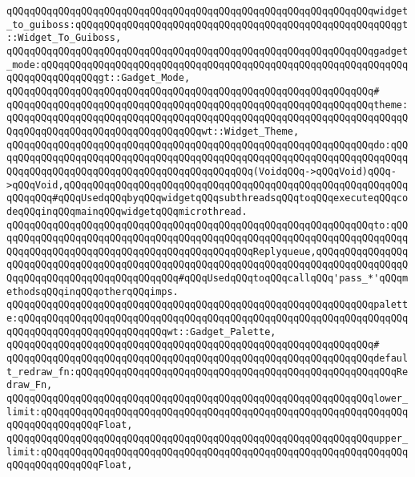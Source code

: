 \verb|qQQqqQQqqQQqqQQqqQQqqQQqqQQqqQQqqQQqqQQqqQQqqQQqqQQqqQQqqQQqqQQqwidget_to_guiboss:qQQqqQQqqQQqqQQqqQQqqQQqqQQqqQQqqQQqqQQqqQQqqQQqqQQqqQQqgt::Widget_To_Guiboss,|\newline
\verb|qQQqqQQqqQQqqQQqqQQqqQQqqQQqqQQqqQQqqQQqqQQqqQQqqQQqqQQqqQQqqQQqgadget_mode:qQQqqQQqqQQqqQQqqQQqqQQqqQQqqQQqqQQqqQQqqQQqqQQqqQQqqQQqqQQqqQQqqQQqqQQqqQQqqQQqgt::Gadget_Mode,|\newline
\verb|qQQqqQQqqQQqqQQqqQQqqQQqqQQqqQQqqQQqqQQqqQQqqQQqqQQqqQQqqQQqqQQq#|\newline
\verb|qQQqqQQqqQQqqQQqqQQqqQQqqQQqqQQqqQQqqQQqqQQqqQQqqQQqqQQqqQQqqQQqtheme:qQQqqQQqqQQqqQQqqQQqqQQqqQQqqQQqqQQqqQQqqQQqqQQqqQQqqQQqqQQqqQQqqQQqqQQqqQQqqQQqqQQqqQQqqQQqqQQqqQQqqQQqwt::Widget_Theme,|\newline
\verb|qQQqqQQqqQQqqQQqqQQqqQQqqQQqqQQqqQQqqQQqqQQqqQQqqQQqqQQqqQQqqQQqdo:qQQqqQQqqQQqqQQqqQQqqQQqqQQqqQQqqQQqqQQqqQQqqQQqqQQqqQQqqQQqqQQqqQQqqQQqqQQqqQQqqQQqqQQqqQQqqQQqqQQqqQQqqQQqqQQqqQQq(VoidqQQq->qQQqVoid)qQQq->qQQqVoid,qQQqqQQqqQQqqQQqqQQqqQQqqQQqqQQqqQQqqQQqqQQqqQQqqQQqqQQqqQQqqQQqqQQq#qQQqUsedqQQqbyqQQqwidgetqQQqsubthreadsqQQqtoqQQqexecuteqQQqcodeqQQqinqQQqmainqQQqwidgetqQQqmicrothread.|\newline
\verb|qQQqqQQqqQQqqQQqqQQqqQQqqQQqqQQqqQQqqQQqqQQqqQQqqQQqqQQqqQQqqQQqto:qQQqqQQqqQQqqQQqqQQqqQQqqQQqqQQqqQQqqQQqqQQqqQQqqQQqqQQqqQQqqQQqqQQqqQQqqQQqqQQqqQQqqQQqqQQqqQQqqQQqqQQqqQQqqQQqqQQqReplyqueue,qQQqqQQqqQQqqQQqqQQqqQQqqQQqqQQqqQQqqQQqqQQqqQQqqQQqqQQqqQQqqQQqqQQqqQQqqQQqqQQqqQQqqQQqqQQqqQQqqQQqqQQqqQQqqQQqqQQq#qQQqUsedqQQqtoqQQqcallqQQq'pass_*'qQQqmethodsqQQqinqQQqotherqQQqimps.|\newline
\verb|qQQqqQQqqQQqqQQqqQQqqQQqqQQqqQQqqQQqqQQqqQQqqQQqqQQqqQQqqQQqqQQqpalette:qQQqqQQqqQQqqQQqqQQqqQQqqQQqqQQqqQQqqQQqqQQqqQQqqQQqqQQqqQQqqQQqqQQqqQQqqQQqqQQqqQQqqQQqqQQqqQQqwt::Gadget_Palette,|\newline
\verb|qQQqqQQqqQQqqQQqqQQqqQQqqQQqqQQqqQQqqQQqqQQqqQQqqQQqqQQqqQQqqQQq#|\newline
\verb|qQQqqQQqqQQqqQQqqQQqqQQqqQQqqQQqqQQqqQQqqQQqqQQqqQQqqQQqqQQqqQQqdefault_redraw_fn:qQQqqQQqqQQqqQQqqQQqqQQqqQQqqQQqqQQqqQQqqQQqqQQqqQQqqQQqRedraw_Fn,|\newline
\newline
\verb|qQQqqQQqqQQqqQQqqQQqqQQqqQQqqQQqqQQqqQQqqQQqqQQqqQQqqQQqqQQqqQQqlower_limit:qQQqqQQqqQQqqQQqqQQqqQQqqQQqqQQqqQQqqQQqqQQqqQQqqQQqqQQqqQQqqQQqqQQqqQQqqQQqqQQqFloat,|\newline
\verb|qQQqqQQqqQQqqQQqqQQqqQQqqQQqqQQqqQQqqQQqqQQqqQQqqQQqqQQqqQQqqQQqupper_limit:qQQqqQQqqQQqqQQqqQQqqQQqqQQqqQQqqQQqqQQqqQQqqQQqqQQqqQQqqQQqqQQqqQQqqQQqqQQqqQQqFloat,|\newline
